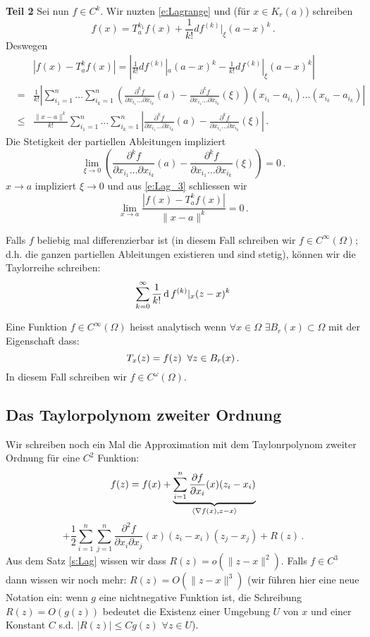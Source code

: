 \begin{Bew}
{\bf Teil 2} Sei nun $f\in C^k$. Wir nuzten \eqref{e:Lagrange} und (f\"ur $x\in K_r (a)$) schreiben
\begin{equation}\label{e:Lag_2}
f (x) = T^{k_1}_a f (x) + \frac{1}{k!} df^{(k)} |_\xi (a-x)^k\, .
\end{equation}
Deswegen
\begin{eqnarray}
&&\left|f(x) - T^k _a f (x)\right| = \left|\frac{1}{k!} df^{(k)} |_a (a-x)^k - \frac{1}{k!} df^{(k)} |_\xi (a-x)^k\right|\nonumber\\
&=& \frac{1}{k!} \left| \sum_{i_1=1}^n \ldots \sum_{i_k=1}^n 
\left(\frac{\partial^k f}{\partial x_{i_1} \ldots \partial x_{i_k}} (a) -
\frac{\partial^k f}{\partial x_{i_1} \ldots \partial x_{i_k}} (\xi)\right) (x_{i_1}-a_{i_1}) \ldots (x_{i_k}-a_{i_k})\right|\nonumber\\
&\leq& \frac{\|x-a\|^k}{k!}  \sum_{i_1=1}^n \ldots \sum_{i_k=1}^n 
\left|\frac{\partial^k f}{\partial x_{i_1} \ldots \partial x_{i_k}} (a) -
\frac{\partial^k f}{\partial x_{i_1} \ldots \partial x_{i_k}} (\xi)\right|\, .\label{e:Lag_3}
\end{eqnarray}
Die Stetigkeit der partiellen Ableitungen impliziert 
\[
\lim_{\xi\to 0} \left(\frac{\partial^k f}{\partial x_{i_1} \ldots \partial x_{i_k}} (a) -
\frac{\partial^k f}{\partial x_{i_1} \ldots \partial x_{i_k}} (\xi)\right) = 0\, .
\]
$x\to a$ impliziert $\xi\to 0$ und aus \eqref{e:Lag_3} schliessen wir 
\[
\lim_{x\to a}\frac{\left|f(x) - T^k _a f (x)\right|}{\|x-a\|^k} = 0\, .
\]
\end{Bew}

Falls $f$ beliebig mal differenzierbar ist (in diesem Fall schreiben wir $f\in C^{\infty}(\Omega)$; d.h. die ganzen partiellen Ableitungen existieren und sind stetig), können wir die Taylorreihe schreiben:
\[\sum_{k=0}^\infty\frac{1}{k!}\operatorname{d} f^{(k)}|_x(z-x)^k\]

\begin{Def}
  Eine Funktion $f\in C^\infty(\Omega)$ heisst analytisch wenn $\forall x\in \Omega$ $\exists B_r(x)\subset\Omega$ mit der Eigenschaft dass:
  \[T_x(z)=f(z)\hspace{2mm}\forall z\in B_r(x)\, .\]
In diesem Fall schreiben wir $f\in C^\omega (\Omega)$.
\end{Def}

\subsection{Das Taylorpolynom zweiter Ordnung}
Wir schreiben noch ein Mal die Approximation mit dem Taylonrpolynom zweiter Ordnung
f\"ur eine $C^2$ Funktion:
\[f(z)=f(x)+\underbrace{\sum^n_{i=1}\dfrac{\partial f}{\partial x_i}(x)(z_i-x_i)}_{\langle \nabla f(x), z-x \rangle}\]
\begin{equation}
  \label{e:110328gelb}
  +\frac{1}{2}\sum^n_{i=1}\sum^n_{j=1}\frac{\partial^2f}{\partial x_i\partial x_j}(x)(z_i-x_i)(z_j-x_j)
+ R (z)\, .
\end{equation}
Aus dem Satz \ref{s:Lag} wissen wir dass $R (z) = o (\|z-x\|^2)$. Falls $f\in C^3$ dann wissen wir noch
mehr: $R(z) = O (\|z-x\|^3)$ (wir f\"uhren hier eine neue Notation ein: wenn $g$ eine nichtnegative Funktion
ist, die Schreibung $R(z) = O(g(z))$ bedeutet die Existenz einer Umgebung $U$ von $x$ und einer
Konstant $C$ s.d. $|R(z)|\leq Cg (z)$ $\forall z\in U$).

